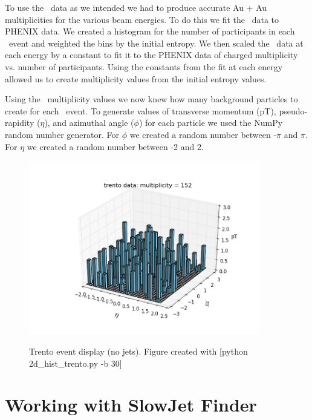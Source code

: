 \documentclass[11pt]{article}
\begin{document}
To use the \trento\ data as we intended we had to produce accurate Au + Au multiplicities for the various beam energies. To do this we fit the \trento\ data to PHENIX data. We created a histogram for the number of participants in each \trento\ event and weighted the bins by the initial entropy. We then scaled the \trento\ data at each energy by a constant to fit it to the PHENIX data of charged multiplicity vs. number of participants. Using the constants from the fit at each energy allowed us to create multiplicity values from the initial entropy values.

Using the \trento\ multiplicity values we now knew how many background particles to create for each \trento\ event. To generate values of transverse momentum (pT), pseudo-rapidity ($\eta$), and azimuthal angle ($\phi$) for each particle we used the NumPy random number generator. For $\phi$ we created a random number between -$\pi$ and $\pi$. For $\eta$ we created a random number between -2 and 2. 

\begin{figure}[h]
\begin{center}
\includegraphics[width=0.9\textwidth]{2d_hist_trento.png}
\label{fig_label}
\caption{Trento event display (no jets).  Figure created with [python 2d\_hist\_trento.py -b 30]}
\end{center}
\end{figure}

\section{Working with SlowJet Finder}
%
%
\end{document}
